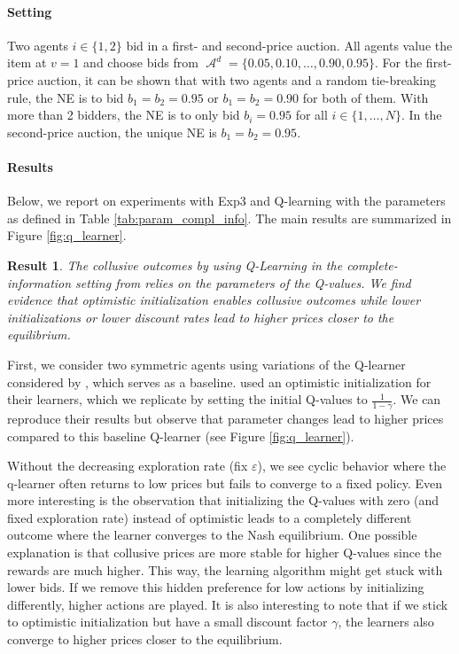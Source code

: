 \documentclass{article}
\DeclareMathOperator{\Acal}{\mathcal{A}}
\newtheorem{result}{Result}
\begin{document}
\paragraph{Setting} Two agents $i \in \{1,2\}$ bid in a first- and second-price auction. All agents value the item at $v = 1$ and choose bids from $\Acal^d = \{0.05, 0.10, \dots, 0.90, 0.95 \}$. 
For the first-price auction, it can be shown that with two agents and a random tie-breaking rule, the NE is to bid $b_1 = b_2 = 0.95$ or $b_1 = b_2 = 0.90$ for both of them. With more than 2 bidders, the NE is to only bid $b_i =0.95$ for all $i \in \{1, \dots, N\}$. In the second-price auction, the unique NE is $b_1 = b_2 = 0.95$.

\paragraph{Results}
Below, we report on experiments with Exp3 and Q-learning with the parameters as defined in Table \ref{tab:param_compl_info}.
The main results are summarized in Figure \ref{fig:q_learner}.     



\begin{result}
	The collusive outcomes by using Q-Learning in the complete-information setting from \citet{banchio2022artificial} relies on the parameters of the Q-values. We find evidence that optimistic initialization enables collusive outcomes while lower initializations or lower discount rates lead to higher prices closer to the equilibrium. 
\end{result}

First, we consider two symmetric agents using variations of the Q-learner considered by \citet{banchio2022artificial}, which serves as a baseline. \citet{banchio2022artificial} used an optimistic initialization for their learners, which we replicate by setting the initial Q-values to $\tfrac{1}{1-\gamma}$. 
We can reproduce their results but observe that parameter changes lead to higher prices compared to this baseline Q-learner (see Figure \ref{fig:q_learner}). 

Without the decreasing exploration rate (fix $\varepsilon$), we see cyclic behavior where the q-learner often returns to low prices but fails to converge to a fixed policy. 
Even more interesting is the observation that initializing the Q-values with zero (and fixed exploration rate) instead of optimistic leads to a completely different outcome where the learner converges to the Nash equilibrium. 
One possible explanation is that collusive prices are more stable for higher Q-values since the rewards are much higher. 
This way, the learning algorithm might get stuck with lower bids. 
If we remove this hidden preference for low actions by initializing differently, higher actions are played. 
It is also interesting to note that if we stick to optimistic initialization but have a small discount factor $\gamma$, the learners also converge to higher prices closer to the equilibrium.
\end{document}
